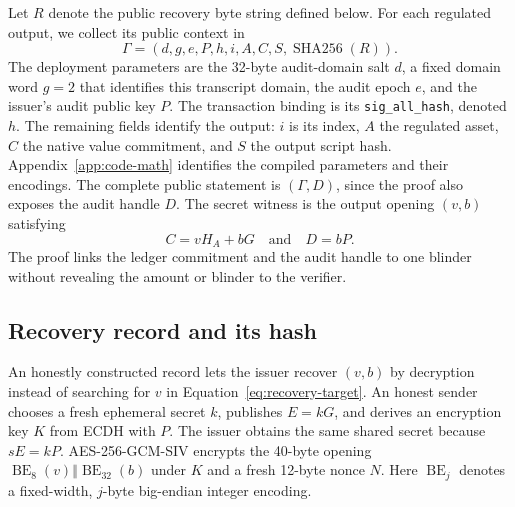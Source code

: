 \documentclass[11pt]{article}
\newcommand{\sha}{\operatorname{SHA256}}
\begin{document}
    Let $R$ denote the public recovery byte string defined below.
    For each regulated output, we collect its public context in
    \begin{equation}
        \Gamma=(d,g,e,P,h,i,A,C,S,\sha(R)).
        \label{eq:statement}
    \end{equation}
    The deployment parameters are the 32-byte audit-domain salt $d$, a fixed domain word $g=2$ that identifies this transcript domain, the audit epoch $e$, and the issuer's audit public key $P$.
    The transaction binding is its \texttt{sig\_all\_hash}, denoted $h$.
    The remaining fields identify the output: $i$ is its index, $A$ the regulated asset, $C$ the native value commitment, and $S$ the output script hash.
    Appendix~\ref{app:code-math} identifies the compiled parameters and their encodings.
    The complete public statement is $(\Gamma,D)$, since the proof also exposes the audit handle $D$.
    The secret witness is the output opening $(v,b)$ satisfying
    \[
        C=vH_A+bG \quad\text{and}\quad D=bP.
    \]
    The proof links the ledger commitment and the audit handle to one blinder without revealing the amount or blinder to the verifier.

    \subsection{Recovery record and its hash}
    \label{sec:recovery-record}

    An honestly constructed record lets the issuer recover $(v,b)$ by decryption instead of searching for $v$ in Equation~\ref{eq:recovery-target}.
    An honest sender chooses a fresh ephemeral secret $k$, publishes $E=kG$, and derives an encryption key $K$ from ECDH with $P$.
    The issuer obtains the same shared secret because $sE=kP$.
    AES-256-GCM-SIV encrypts the 40-byte opening $\operatorname{BE}_8(v)\mathbin\Vert\operatorname{BE}_{32}(b)$ under $K$ and a fresh 12-byte nonce $N$.
    Here $\operatorname{BE}_j$ denotes a fixed-width, $j$-byte big-endian integer encoding.
\end{document}
